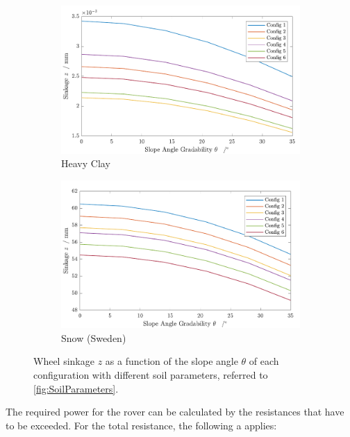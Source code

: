 \begin{figure}[htb]
     \centering
     \begin{subfigure}[b]{0.49\textwidth}
         \centering
         \includegraphics[width=\textwidth]{Media/Sinkage for each config in heavy clay.pdf}
         \caption{Heavy Clay}
     \end{subfigure}
     \hfill
     \begin{subfigure}[b]{0.49\textwidth}
         \centering
         \includegraphics[width=\textwidth]{Media/Sinkage for each config in snow (Sweden).pdf}
         \caption{Snow (Sweden)}
     \end{subfigure}
     \caption{Wheel sinkage \(z\) as a function of the slope angle \(\theta\) of each configuration with different soil parameters, referred to \autoref{fig:SoilParameters}.}
     \label{fig:Sinkage}
\end{figure}

The required power for the rover can be calculated by the resistances that have to be exceeded. For the total resistance, the following a applies:

